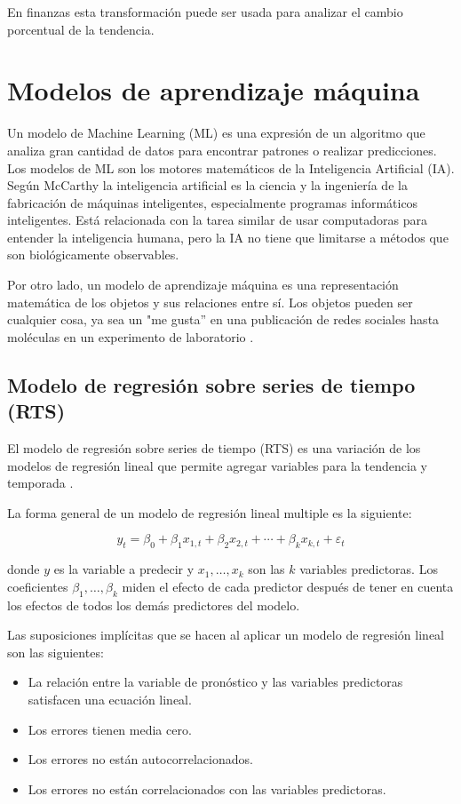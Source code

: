 En finanzas esta transformación puede ser usada para analizar el cambio porcentual de la tendencia.


\section{Modelos de aprendizaje máquina}
\label{modelosmachinelearning}
Un modelo de Machine Learning (ML) es una expresión de un algoritmo que analiza gran cantidad de datos para encontrar patrones o realizar predicciones. Los modelos de ML son los motores matemáticos de la Inteligencia Artificial (IA).
Según McCarthy \parencite*{mccarthyWHATARTIFICIALINTELLIGENCE2004} la inteligencia artificial es la ciencia y la ingeniería de la fabricación de máquinas inteligentes, especialmente programas informáticos inteligentes. Está relacionada con la tarea similar de usar computadoras para entender la inteligencia humana, pero la IA no tiene que limitarse a métodos que son biológicamente observables.

Por otro lado, un modelo de aprendizaje máquina es una representación matemática de los objetos y sus relaciones entre sí. Los objetos pueden ser cualquier cosa, ya sea un "me gusta'' en una publicación de redes sociales hasta moléculas en un experimento de laboratorio \parencite{parsonsQueEsModelo2021}.

\subsection{Modelo de regresión sobre series de tiempo (RTS)}
El modelo de regresión sobre series de tiempo (RTS) es una variación de los modelos de regresión lineal que permite agregar variables para la tendencia y temporada \parencite{TslmFitLinear}. 

La forma general de un modelo de regresión lineal multiple es la siguiente:

\[
y_{t}=\beta_{0}+\beta_{1} x_{1, t}+\beta_{2} x_{2, t}+\cdots+\beta_{k} x_{k, t}+\varepsilon_{t}
\]

donde $y$ es la variable a predecir y $x_{1}, \ldots, x_{k}$ son las $k$ variables predictoras.
Los coeficientes $\beta_{1}, \ldots, \beta_{k}$ miden el efecto de cada predictor después de tener en cuenta los efectos de todos los demás predictores del modelo.

Las suposiciones implícitas que se hacen al aplicar un modelo de regresión lineal son las siguientes:

\begin{itemize}
\item La relación entre la variable de pronóstico y las variables predictoras satisfacen una ecuación lineal.
\item Los errores tienen media cero.
\item Los errores no están autocorrelacionados.
\item Los errores no están correlacionados con las variables predictoras.
\end{itemize}

